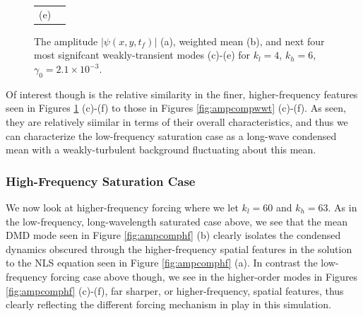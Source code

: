 \documentclass[a4paper,11pt]{article}
\begin{document}
\begin{figure}[!ht]
\begin{tabular}{cc}
(e) & 
\end{tabular}
\caption{The amplitude $\left|\psi(x,y,t_{f})\right|$ (a), weighted mean (b), and next four most signifcant weakly-transient modes (c)-(e) for $k_{l}=4$, $k_{h}=6$, $\gamma_{0}=2.1\times 10^{-3}$. }
\label{fig:ampcomplf}
\end{figure}

Of interest though is the relative similarity in the finer, higher-frequency features seen in Figures \ref{fig:ampcomplf} (c)-(f) to those in Figures \ref{fig:ampcompwwt} (c)-(f).  As seen, they are relatively siimilar in terms of their overall characteristics, and thus we can characterize the low-frequency saturation case as a long-wave condensed mean with a weakly-turbulent background fluctuating about this mean.  

\subsubsection*{High-Frequency Saturation Case}
We now look at higher-frequency forcing where we let $k_{l}=60$ and $k_{h}=63$.  As in the low-frequency, long-wavelength saturated case above, we see that the mean DMD mode seen in Figure \ref{fig:ampcomphf} (b) clearly isolates the condensed dynamics obscured through the higher-frequency spatial features in the solution to the NLS equation seen in Figure \ref{fig:ampcomphf} (a).  In contrast the low-frequency forcing case above though, we see in the higher-order modes in Figures \ref{fig:ampcomphf} (c)-(f), far sharper, or higher-frequency, spatial features, thus clearly reflecting the different forcing mechanism in play in this simulation.   
\end{document}
